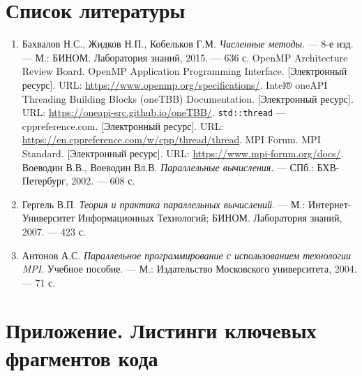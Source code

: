 \documentclass[a4paper,12pt]{article}
\begin{document}
\section{Список литературы}
\label{sec:references}
\begin{enumerate}
     Метод Симпсона // Википедия. [Электронный ресурс]. URL: \url{https://ru.wikipedia.org/wiki/Формула_симпсона}.
    \item Бахвалов Н.С., Жидков Н.П., Кобельков Г.М. \textit{Численные методы}. — 8-е изд. — М.: БИНОМ. Лаборатория знаний, 2015. — 636 с.
     OpenMP Architecture Review Board. OpenMP Application Programming Interface. [Электронный ресурс]. URL: \url{https://www.openmp.org/specifications/}.
     Intel® oneAPI Threading Building Blocks (oneTBB) Documentation. [Электронный ресурс]. URL: \url{https://oneapi-src.github.io/oneTBB/}.
     \texttt{std::thread} — cppreference.com. [Электронный ресурс]. URL: \url{https://en.cppreference.com/w/cpp/thread/thread}.
     MPI Forum. MPI Standard. [Электронный ресурс]. URL: \url{https://www.mpi-forum.org/docs/}.
     Воеводин В.В., Воеводин Вл.В. \textit{Параллельные вычисления}. — СПб.: БХВ-Петербург, 2002. — 608 с.
    \item Гергель В.П. \textit{Теория и практика параллельных вычислений}. — М.: Интернет-Университет Информационных Технологий; БИНОМ. Лаборатория знаний, 2007. — 423 с.
    \item Антонов А.С. \textit{Параллельное программирование с использованием технологии MPI}. Учебное пособие. — М.: Издательство Московского университета, 2004. — 71 с.
\end{enumerate}

\newpage
\section{Приложение. Листинги ключевых фрагментов кода}
\label{sec:appendix}
\end{document}
